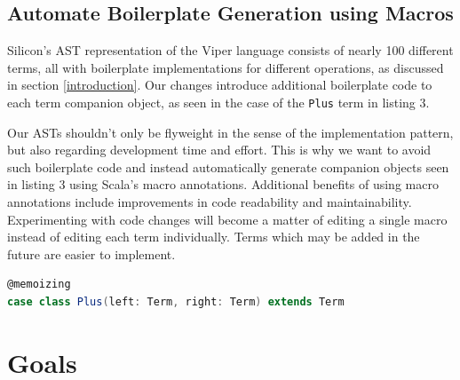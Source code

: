 \documentclass[11pt]{article}
\begin{document}
    \subsection{Automate Boilerplate Generation using Macros} \label{approach:macros}

    Silicon's AST representation of the Viper language consists of nearly 100 different terms,
    all with boilerplate implementations for different operations, as discussed in section \ref{introduction}.
    Our changes introduce additional boilerplate code to each term companion object, as seen in the case
    of the \texttt{Plus} term in listing 3.

    Our ASTs shouldn't only be flyweight in the sense of the implementation pattern, but also
    regarding development time and effort. This is why we want to avoid such boilerplate
    code and instead automatically generate companion objects seen in listing 3 using Scala's macro annotations.
    Additional benefits of using macro annotations include improvements in code
    readability and maintainability. Experimenting with code changes will become a matter
    of editing a single macro instead of editing each term individually.
    Terms which may be added in the future are easier to implement.

    \begin{lstlisting}[language=Scala, caption=One possible way to use macro annotations to automatically generate code in listing 3.]
@memoizing
case class Plus(left: Term, right: Term) extends Term
        \end{lstlisting}

    \section{Goals}
\end{document}
